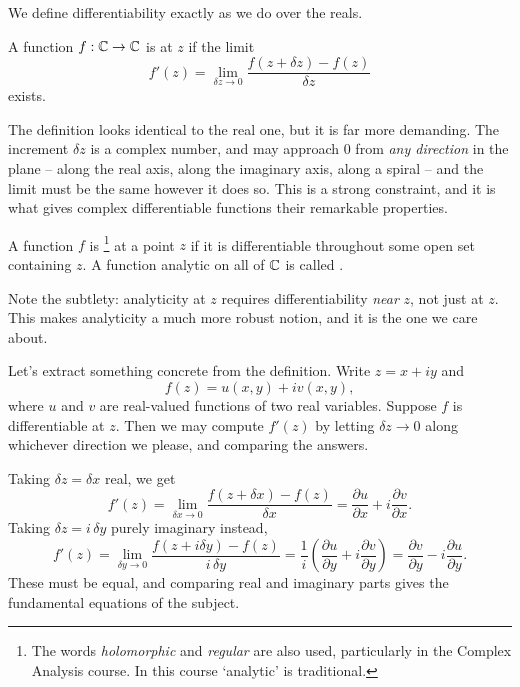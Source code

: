 \documentclass[a4paper]{scrartcl}
\begin{document}
We define differentiability exactly as we do over the reals.

\begin{definition}[Differentiability]
	A function $f : \mathbb{C} \to \mathbb{C}$ is  at $z$ if the limit
	$$
	f'(z) = \lim_{\delta z \to 0} \frac{f(z + \delta z) - f(z)}{\delta z}
	$$
	exists.
\end{definition}

The definition looks identical to the real one, but it is far more demanding. The increment $\delta z$ is a complex number, and may approach $0$ from \emph{any direction} in the plane -- along the real axis, along the imaginary axis, along a spiral -- and the limit must be the same however it does so. This is a strong constraint, and it is what gives complex differentiable functions their remarkable properties.

\begin{definition}
	A function $f$ is \footnote{The words \emph{holomorphic} and \emph{regular} are also used, particularly in the Complex Analysis course. In this course `analytic' is traditional.} at a point $z$ if it is differentiable throughout some open set containing $z$. A function analytic on all of $\mathbb{C}$ is called .
\end{definition}

Note the subtlety: analyticity at $z$ requires differentiability \emph{near} $z$, not just at $z$. This makes analyticity a much more robust notion, and it is the one we care about.

Let's extract something concrete from the definition. Write $z = x + iy$ and
$$
f(z) = u(x, y) + i v(x, y),
$$
where $u$ and $v$ are real-valued functions of two real variables. Suppose $f$ is differentiable at $z$. Then we may compute $f'(z)$ by letting $\delta z \to 0$ along whichever direction we please, and comparing the answers.

Taking $\delta z = \delta x$ real, we get
$$
f'(z) = \lim_{\delta x \to 0} \frac{f(z + \delta x) - f(z)}{\delta x} = \frac{\partial u}{\partial x} + i \frac{\partial v}{\partial x}.
$$
Taking $\delta z = i \, \delta y$ purely imaginary instead,
$$
f'(z) = \lim_{\delta y \to 0} \frac{f(z + i\delta y) - f(z)}{i \, \delta y} = \frac{1}{i}\left(\frac{\partial u}{\partial y} + i \frac{\partial v}{\partial y}\right) = \frac{\partial v}{\partial y} - i \frac{\partial u}{\partial y}.
$$
These must be equal, and comparing real and imaginary parts gives the fundamental equations of the subject.
\end{document}
